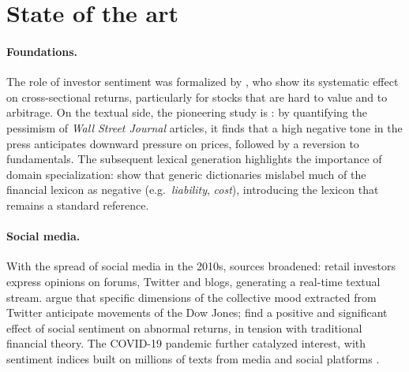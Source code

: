 \documentclass[a4paper,11pt]{article}
\begin{document}
\section{State of the art}
\label{sec:sota}

\paragraph{Foundations.} The role of investor sentiment was formalized by \textcite{baker2007investor}, who show its systematic effect on cross-sectional returns, particularly for stocks that are hard to value and to arbitrage. On the textual side, the pioneering study is \textcite{tetlock2007giving}: by quantifying the pessimism of \textit{Wall Street Journal} articles, it finds that a high negative tone in the press anticipates downward pressure on prices, followed by a reversion to fundamentals. The subsequent lexical generation highlights the importance of domain specialization: \textcite{loughran2011liability} show that generic dictionaries mislabel much of the financial lexicon as negative (e.g.\ \textit{liability}, \textit{cost}), introducing the lexicon that remains a standard reference.

\paragraph{Social media.} With the spread of social media in the 2010s, sources broadened: retail investors express opinions on forums, Twitter and blogs, generating a real-time textual stream. \textcite{bollen2011twitter} argue that specific dimensions of the collective mood extracted from Twitter anticipate movements of the Dow Jones; \textcite{mcgurk2020stock} find a positive and significant effect of social sentiment on abnormal returns, in tension with traditional financial theory. The COVID-19 pandemic further catalyzed interest, with sentiment indices built on millions of texts from media and social platforms \parencite{duan2021covid}.
\end{document}
